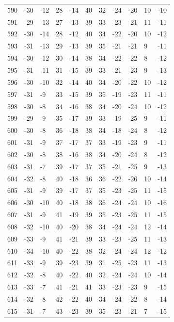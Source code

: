 \begin{table}[H]
\begin{tabular}{lllllllllll}
590 & -30 & -12 & 28 & -14 & 40 & 32 & -24 & -20 & 10 & -10 \\
591 & -29 & -13 & 27 & -13 & 39 & 33 & -23 & -21 & 11 & -11 \\
592 & -30 & -14 & 28 & -12 & 40 & 34 & -22 & -20 & 10 & -12 \\
593 & -31 & -13 & 29 & -13 & 39 & 35 & -21 & -21 & 9 & -11 \\
594 & -30 & -12 & 30 & -14 & 38 & 34 & -22 & -22 & 8 & -12 \\
595 & -31 & -11 & 31 & -15 & 39 & 33 & -21 & -23 & 9 & -13 \\
596 & -30 & -10 & 32 & -14 & 40 & 34 & -20 & -22 & 10 & -12 \\
597 & -31 & -9 & 33 & -15 & 39 & 35 & -19 & -23 & 11 & -11 \\
598 & -30 & -8 & 34 & -16 & 38 & 34 & -20 & -24 & 10 & -12 \\
599 & -29 & -9 & 35 & -17 & 39 & 33 & -19 & -25 & 9 & -11 \\
600 & -30 & -8 & 36 & -18 & 38 & 34 & -18 & -24 & 8 & -12 \\
601 & -31 & -9 & 37 & -17 & 37 & 33 & -19 & -23 & 9 & -11 \\
602 & -30 & -8 & 38 & -16 & 38 & 34 & -20 & -24 & 8 & -12 \\
603 & -31 & -7 & 39 & -17 & 37 & 35 & -21 & -25 & 9 & -13 \\
604 & -32 & -8 & 40 & -18 & 36 & 36 & -22 & -26 & 10 & -14 \\
605 & -31 & -9 & 39 & -17 & 37 & 35 & -23 & -25 & 11 & -15 \\
606 & -30 & -10 & 40 & -18 & 38 & 36 & -24 & -24 & 10 & -16 \\
607 & -31 & -9 & 41 & -19 & 39 & 35 & -23 & -25 & 11 & -15 \\
608 & -32 & -10 & 40 & -20 & 38 & 34 & -24 & -24 & 12 & -14 \\
609 & -33 & -9 & 41 & -21 & 39 & 33 & -23 & -25 & 11 & -13 \\
610 & -34 & -10 & 40 & -22 & 38 & 32 & -24 & -24 & 12 & -12 \\
611 & -33 & -9 & 39 & -23 & 39 & 31 & -25 & -23 & 11 & -13 \\
612 & -32 & -8 & 40 & -22 & 40 & 32 & -24 & -24 & 10 & -14 \\
613 & -33 & -7 & 41 & -21 & 41 & 33 & -23 & -23 & 9 & -15 \\
614 & -32 & -8 & 42 & -22 & 40 & 34 & -24 & -22 & 8 & -14 \\
615 & -31 & -7 & 43 & -23 & 39 & 35 & -23 & -21 & 7 & -15 \\

\end{tabular}
\end{table}

